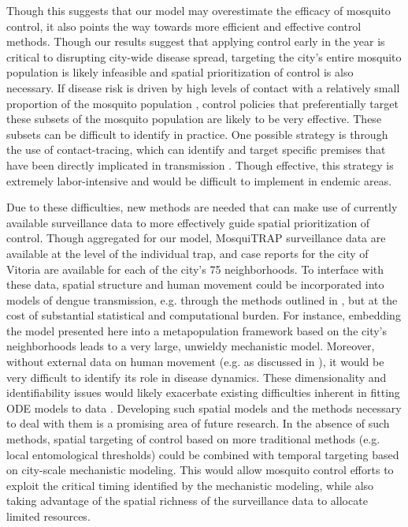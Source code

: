 \documentclass[10pt,letterpaper]{article}
\begin{document}
Though this suggests that our model may overestimate the efficacy of mosquito control, it also points the way towards more efficient and effective control methods.
Though our results suggest that applying control early in the year is critical to disrupting city-wide disease spread, targeting the city's entire mosquito population is likely infeasible and spatial prioritization of control is also necessary.
If disease risk is driven by high levels of contact with a relatively small proportion of the mosquito population \cite{Yoon2012}, control policies that preferentially target these subsets of the mosquito population are likely to be very effective.
These subsets can be difficult to identify in practice.
One possible strategy is through the use of contact-tracing, which can identify and target specific premises that have been directly implicated in transmission \cite{Vazquez-Prokopec2017}.
Though effective, this strategy is extremely labor-intensive and would be difficult to implement in endemic areas.

Due to these difficulties, new methods are needed that can make use of currently available surveillance data to more effectively guide spatial prioritization of control.
Though aggregated for our model, MosquiTRAP surveillance data are available at the level of the individual trap, and case reports for the city of Vitoria are available for each of the city's 75 neighborhoods.
To interface with these data, spatial structure and human movement could be incorporated into models of dengue transmission, e.g. through the methods outlined in \cite{Cosner2015}, but at the cost of substantial statistical and computational burden.
For instance, embedding the model presented here into a metapopulation framework based on the city's neighborhoods leads to a very large, unwieldy mechanistic model.
Moreover, without external data on human movement (e.g. as discussed in \cite{Stoddard2009}), it would be very difficult to identify its role in disease dynamics.
These dimensionality and identifiability issues would likely exacerbate existing difficulties inherent in fitting ODE models to data \cite{Girolami2008, Calderhead2011}.
Developing such spatial models and the methods necessary to deal with them is a promising area of future research.
In the absence of such methods, spatial targeting of control based on more traditional methods (e.g. local entomological thresholds) could be combined with temporal targeting based on city-scale mechanistic modeling.
This would allow mosquito control efforts to exploit the critical timing identified by the mechanistic modeling, while also taking advantage of the spatial richness of the surveillance data to allocate limited resources. 
\end{document}
